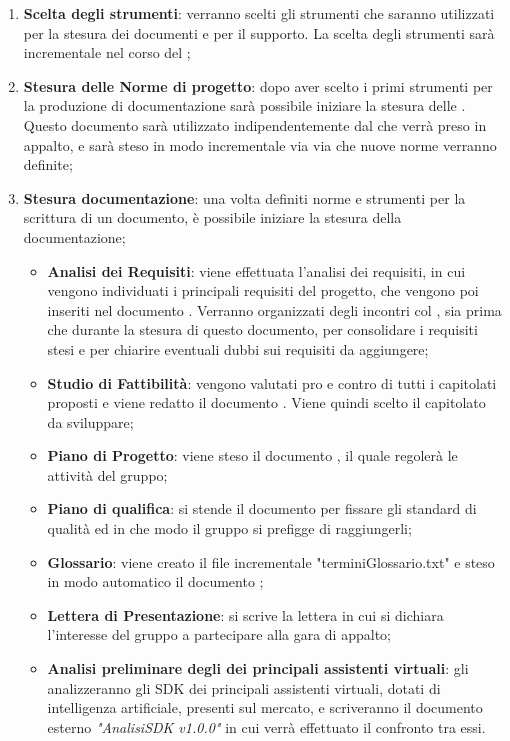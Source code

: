 \documentclass[./PianoDiProgetto.tex]{subfiles}
\begin{document}
  \begin{enumerate}
		\item \textbf{Scelta degli strumenti}: verranno scelti gli strumenti che saranno utilizzati per la stesura dei documenti e per il supporto. La scelta degli strumenti sarà incrementale nel corso del ;
		\item \textbf{Stesura delle Norme di progetto}: dopo aver scelto i primi strumenti per la produzione di documentazione sarà possibile iniziare la stesura delle \NPdocRR. Questo documento sarà utilizzato indipendentemente dal  che verrà preso in appalto, e sarà steso in modo incrementale via via che nuove norme verranno definite;
		\item \textbf{Stesura documentazione}: una volta definiti norme e strumenti per la scrittura di un documento, è possibile iniziare la stesura della documentazione;
    \begin{itemize}
      \item \textbf{Analisi dei Requisiti}: viene effettuata l'analisi dei requisiti, in cui vengono individuati i principali requisiti del progetto, che vengono poi inseriti nel documento \ARdocRR. Verranno organizzati degli incontri col , sia prima che durante la stesura di questo documento, per consolidare i requisiti stesi e per chiarire eventuali dubbi sui requisiti da aggiungere;
      \item \textbf{Studio di Fattibilità}: vengono valutati pro e contro di tutti i capitolati proposti e viene redatto il documento \SFdocRR. Viene quindi scelto il capitolato da sviluppare;
      \item \textbf{Piano di Progetto}: viene steso il documento \PPdocRR, il quale regolerà le attività del gruppo;
      \item \textbf{Piano di qualifica}: si stende il documento \PQdocRR per fissare gli standard di qualità ed in che modo il gruppo si prefigge di raggiungerli;
      \item \textbf{Glossario}: viene creato il file incrementale "terminiGlossario.txt" e steso in modo automatico il documento \GldocRR;
      \item \textbf{Lettera di Presentazione}: si scrive la lettera in cui si dichiara l'interesse del gruppo a partecipare alla gara di appalto;
      \item \textbf{Analisi preliminare degli  dei principali assistenti virtuali}: gli \ANP{} analizzeranno gli SDK dei principali assistenti virtuali, dotati di intelligenza artificiale, presenti sul mercato, e scriveranno il documento esterno \textit{"AnalisiSDK v1.0.0"} in cui verrà effettuato il confronto tra  essi.
    \end{itemize}
  \end{enumerate}
  \newpage
\end{document}
